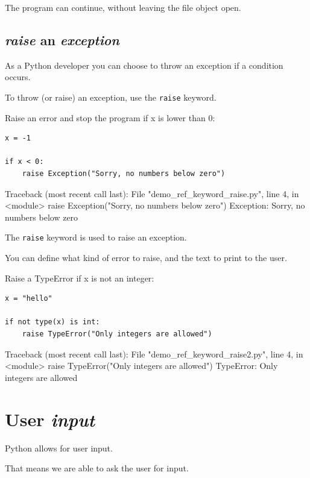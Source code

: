\documentclass[12pt,a4paper]{article}
\newcommand{\code}[1]{%
	\colorbox{backcolour}{\lstinline{#1}}%
}
\begin{document}
The program can continue, without leaving the file object open.
\subsection{\textit{raise} an \textit{exception}}

As a Python developer you can choose to throw an exception if a condition occurs.

To throw (or raise) an exception, use the \code{raise} keyword.

\begin{ebox}
Raise an error and stop the program if x is lower than 0:
	\begin{lstlisting}
x = -1

if x < 0:
    raise Exception("Sorry, no numbers below zero")
	\end{lstlisting}
\tcblower
	\begin{vercode}
Traceback (most recent call last):
  File "demo_ref_keyword_raise.py", line 4, in <module>
    raise Exception("Sorry, no numbers below zero")
Exception: Sorry, no numbers below zero
	\end{vercode}
\end{ebox}

The \code{raise} keyword is used to raise an exception.

You can define what kind of error to raise, and the text to print to the user.

\begin{ebox}
Raise a TypeError if x is not an integer:
	\begin{lstlisting}
x = "hello"

if not type(x) is int:
    raise TypeError("Only integers are allowed")
	\end{lstlisting}
\tcblower
	\begin{vercode}
Traceback (most recent call last):
  File "demo_ref_keyword_raise2.py", line 4, in <module>
    raise TypeError("Only integers are allowed")
TypeError: Only integers are allowed
	\end{vercode}
\end{ebox}
\vfill\newpage
\section{User \textit{input}}\label{pyUserInput}

Python allows for user input.

That means we are able to ask the user for input.
\end{document}
